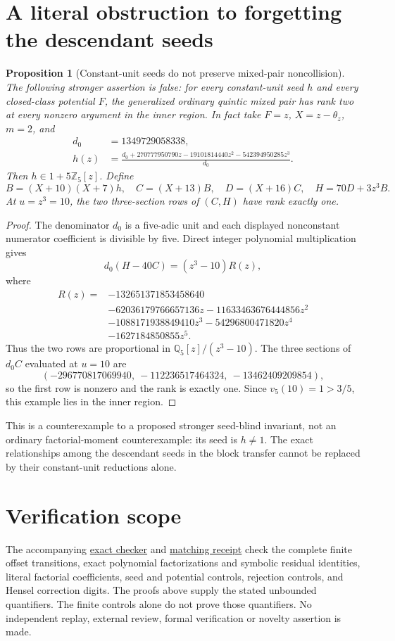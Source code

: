 \documentclass[11pt]{article}
\newtheorem{proposition}{Proposition}
\newcommand{\ZZ}{\mathbb Z}
\newcommand{\QQ}{\mathbb Q}
\begin{document}
\section{A literal obstruction to forgetting the descendant seeds}
\begin{proposition}[Constant-unit seeds do not preserve mixed-pair noncollision]
\label{prop:quintic-seed-blind-obstruction}
The following stronger assertion is false: for every constant-unit
seed $h$ and every closed-class potential $F$, the generalized
ordinary quintic mixed pair has rank two at every nonzero argument
in the inner region.
In fact take $F=z$, $X=z-\theta_z$, $m=2$, and
\[
 \begin{split}
 d_0&=1349729058338,\\
 h(z)&=\frac{d_0+270777950790z-19101814440z^2
                         -542394950285z^3}{d_0}.
 \end{split}
\]
Then $h\in1+5\ZZ_5[z]$.  Define
\[
 B=(X+10)(X+7)h,\quad C=(X+13)B,\quad
 D=(X+16)C,\quad H=70D+3z^3B.
\]
At $u=z^3=10$, the two three-section rows of $(C,H)$ have
rank exactly one.
\end{proposition}
\begin{proof}
The denominator $d_0$ is a five-adic unit and each displayed
nonconstant numerator coefficient is divisible by five.
Direct integer polynomial multiplication gives
\[
 d_0(H-40C)=(z^3-10)R(z),
\]
where
\[
 \begin{aligned}
 R(z)={}&-132651371853458640\\
        &-62036179766657136z-11633463676444856z^2\\
        &-1088171938849410z^3-54296800471820z^4\\
        &-1627184850855z^5 .
 \end{aligned}
\]
Thus the two rows are proportional in
$\QQ_5[z]/(z^3-10)$.
The three sections of $d_0C$ evaluated at $u=10$ are
\[
 (-296770817069940,\ -112236517464324,\ -13462409209854),
\]
so the first row is nonzero and the rank is exactly one.
Since $v_5(10)=1>3/5$, this example lies in the inner region.
\end{proof}
This is a counterexample to a proposed stronger seed-blind invariant,
not an ordinary factorial-moment counterexample: its seed is
$h\ne1$.  The exact relationships among the descendant seeds in
the block transfer cannot be replaced by their constant-unit
reductions alone.

\section*{Verification scope}
The accompanying \href{quintic_five_adic_descent.py}{exact checker}
and \href{quintic_five_adic_descent_verification.json}{matching receipt}
check the complete finite offset transitions, exact polynomial
factorizations and symbolic residual identities, literal factorial
coefficients, seed and potential controls, rejection controls,
and Hensel correction digits.
The proofs above supply the stated unbounded quantifiers.
The finite controls alone do not prove those quantifiers.
No independent replay, external review, formal verification or
novelty assertion is made.
\end{document}
